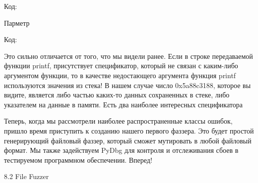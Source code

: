 \documentclass[12pt]{book}
\begin{document}
Код:

Парметр %

Код:

Это сильно отличается от того, что мы видели ранее. Если в строке передаваемой функции printf, присутствует спецификатор, который не связан с каким-либо аргументом функции, то в качестве недостающего аргумента функция printf используются значения из стека! В нашем случае число 0x5a88c3188, которое вы видите, является либо частью каких-то данных сохраненных в стеке, либо указателем на данные в памяти. Есть два наиболее интересных спецификатора %

Теперь, когда мы рассмотрели наиболее распространенные классы ошибок, пришло время приступить к созданию нашего первого фаззера. Это будет простой генерирующий файловый фаззер, который сможет мутировать в любой файловый формат. Мы также задействуем PyDbg для контроля и отслеживания сбоев в тестируемом программном обеспечении. Вперед!


8.2 File Fuzzer
\end{document}
